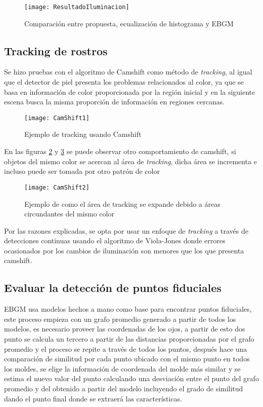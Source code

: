 \begin{figure}[h]
    \centering
    \texttt{[image: ResultadoIluminacion]}
    \caption{Comparación entre propuesta, ecualización de histograma y  \ac{EBGM}}
    \label{im:ResultadoIluminacion}
\end{figure}

\subsection{Tracking de rostros}
Se hizo pruebas con el algoritmo de Camshift como método de \textit{tracking}, al igual que el detector de piel presenta los problemas relacionados al color, ya que se basa en información de color proporcionada por la región inicial y en la siguiente escena busca la misma  proporción de información en regiones cercanas.

\begin{figure}[ht]
	\centering
	\texttt{[image: CamShift1]}
    \caption{Ejemplo de tracking usando Camshift}
    \label{im:CamShift1}
\end{figure}

En las figuras \ref{im:CamShift1} y \ref{im:CamShift2} se puede observar otro comportamiento de camshift, si objetos del mismo color se acercan al área de \textit{tracking}, dicha área se incrementa e incluso puede ser tomada por otro patrón de color

\begin{figure}[ht]
	\centering
	\texttt{[image: CamShift2]}
    \caption{Ejemplo de como el área de tracking se expande debido a áreas circundantes del mismo color}
    \label{im:CamShift2}
\end{figure}

Por las razones explicadas, se opta por usar un enfoque de \textit{tracking} a través de detecciones continuas usando el algoritmo de Viola-Jones donde errores ocasionados por los cambios de iluminación son menores que los que presenta camshift.

\subsection{Evaluar la detección de puntos fiduciales}\label{scc:ResultCLNF}
\ac{EBGM} usa modelos hechos a mano como base para encontrar puntos fiduciales, este proceso empieza con un grafo promedio generado a partir de todos los modelos, es necesario proveer las coordenadas de los ojos, a partir de esto dos punto se calcula un tercero a partir de las distancias proporcionadas por el grafo promedio y el proceso se repite a través de todos los puntos, después hace una comparación de similitud por cada punto ubicado con el mismo punto en todos los moldes, se elige la información de coordenada del molde más similar y se estima el nuevo valor del punto calculando una desviación entre el punto del grafo promedio y del obtenido a partir del modelo incluyendo el grado de similitud dando el punto final donde se extraerá las características.


